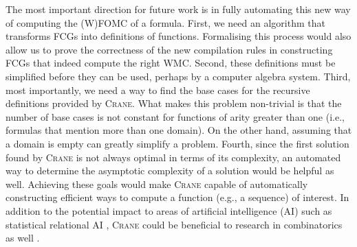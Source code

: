 
The most important direction for future work is in fully automating this new way
of computing the (W)FOMC of a formula. First, we need an algorithm that
transforms FCGs into definitions of functions. Formalising this process would
also allow us to prove the correctness of the new compilation rules in
constructing FCGs that indeed compute the right WMC\@. Second, these definitions
must be simplified before they can be used, perhaps by a computer algebra
system. Third, most importantly, we need a way to find the base cases for the
recursive definitions provided by \textsc{Crane}. What makes this problem
non-trivial is that the number of base cases is not constant for functions of
arity greater than one (i.e., formulas that mention more than one domain). On
the other hand, assuming that a domain is empty can greatly simplify a problem.
Fourth, since the first solution found by \textsc{Crane} is not always optimal
in terms of its complexity, an automated way to determine the asymptotic
complexity of a solution would be helpful as well. Achieving these goals would
make \textsc{Crane} capable of automatically constructing efficient ways to
compute a function (e.g., a sequence) of interest. In addition to the potential
impact to areas of artificial intelligence (AI) such as statistical relational
AI \citep{DBLP:series/synthesis/2016Raedt}, \textsc{Crane} could be beneficial
to research in combinatorics as well \citep{DBLP:conf/ilp/BarvinekB0ZK21}.

